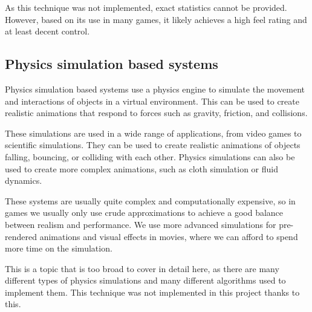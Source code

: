 As this technique was not implemented, exact statistics cannot be provided. However, based on its use in many games, it likely achieves a high feel rating and at least decent control.

\pagebreak

\subsection{Physics simulation based systems}
\label{subsec:physics-simulation-based-systems}

Physics simulation based systems use a physics engine to simulate the movement and interactions of objects in a virtual environment. This can be used to create realistic animations that respond to forces such as gravity, friction, and collisions. 

These simulations are used in a wide range of applications, from video games to scientific simulations. They can be used to create realistic animations of objects falling, bouncing, or colliding with each other. Physics simulations can also be used to create more complex animations, such as cloth simulation or fluid dynamics.

These systems are usually quite complex and computationally expensive, so in games we usually only use crude approximations to achieve a good balance between realism and performance. We use more advanced simulations for pre-rendered animations and visual effects in movies, where we can afford to spend more time on the simulation.

This is a topic that is too broad to cover in detail here, as there are many different types of physics simulations and many different algorithms used to implement them. This technique was not implemented in this project thanks to this.

